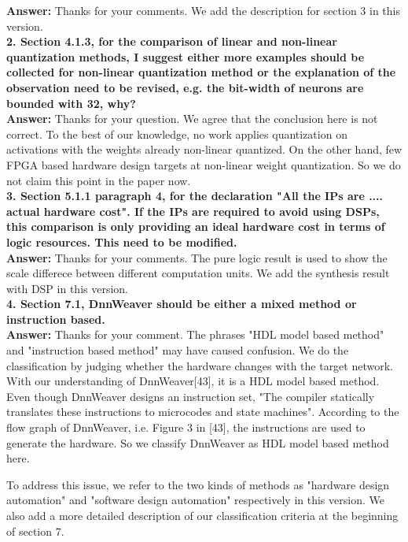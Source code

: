 \documentclass[12pt]{paper}
\newcommand{\rev}[1]{{{\color[rgb]{0,0,1}{#1}}}}
\newcommand{\answer}[1]{\noindent\textbf{Answer:} #1}
\newcommand{\comment}[1]{\noindent\textbf{#1}\\}
\begin{document}
\answer{Thanks for your comments. We add the description for section 3 in this version.}\\

\comment{2. Section 4.1.3, for the comparison of linear and non-linear quantization methods, I suggest either more examples should be collected for non-linear quantization method or the explanation of the observation need to be revised, e.g. the bit-width of neurons are bounded with 32, why?}

\answer{Thanks for your question. We agree that the conclusion here is not correct. To the best of our knowledge, no work applies quantization on activations with the weights already non-linear quantized. On the other hand, few FPGA based hardware design targets at non-linear weight quantization. So we do not claim this point in the paper now.}\\

\comment{3.	Section 5.1.1 paragraph 4, for the declaration "All the IPs are .... actual hardware cost". If the IPs are required to avoid using DSPs, this comparison is only providing an ideal hardware cost in terms of logic resources. This need to be modified.}

\answer{Thanks for your comments. The pure logic result is used to show the scale differece between different computation units. We add the synthesis result with DSP in this version.} \\

\comment{4.	Section 7.1, DnnWeaver should be either a mixed method or instruction based.}

\answer{Thanks for your comment. The phrases "HDL model based method" and "instruction based method" may have caused confusion. We do the classification by judging whether the hardware changes with the target network. With our understanding of DnnWeaver[43], it is a HDL model based method. Even though DnnWeaver designs an instruction set, "The compiler statically translates these instructions to microcodes and state machines". According to the flow graph of DnnWeaver, i.e. Figure 3 in [43], the instructions are used to generate the hardware. So we classify DnnWeaver as HDL model based method here. 

To address this issue, we refer to the two kinds of methods as "hardware design automation" and "software design automation" respectively in this version. We also add a more detailed description of our classification criteria at the beginning of section 7.

\rev{In certain application senarios, various NN models are to be supported with the FPGA accelerator. Whether the accelerator can response to the change in network model promptly and keeps high performance becomes a key feature. To address this problem, various researches have been carried out to automatically map a NN model to FPGA. Mainly two kinds of methods are used: hardware design automation and software design automation. Hardware design automation generates different hardware designs according to different NN models. Software design automation keeps a same accelerator and generates different inputs to the accelerator.}}\\
\end{document}
